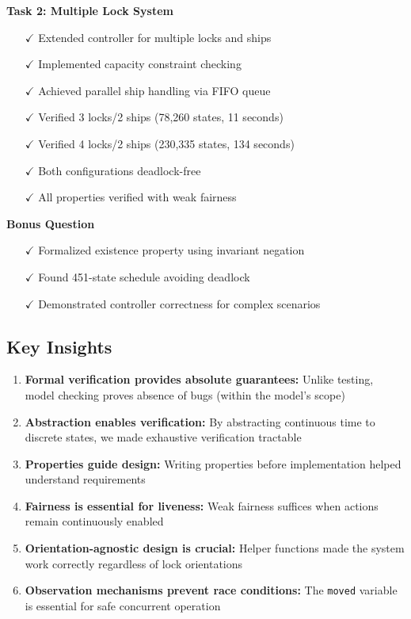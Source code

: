 \documentclass[12pt,a4paper]{article}
\begin{document}
\textbf{Task 2: Multiple Lock System}
\begin{itemize}
    \item[$\checkmark$] Extended controller for multiple locks and ships
    \item[$\checkmark$] Implemented capacity constraint checking
    \item[$\checkmark$] Achieved parallel ship handling via FIFO queue
    \item[$\checkmark$] Verified 3 locks/2 ships (78,260 states, 11 seconds)
    \item[$\checkmark$] Verified 4 locks/2 ships (230,335 states, 134 seconds)
    \item[$\checkmark$] Both configurations deadlock-free
    \item[$\checkmark$] All properties verified with weak fairness
\end{itemize}

\textbf{Bonus Question}
\begin{itemize}
    \item[$\checkmark$] Formalized existence property using invariant negation
    \item[$\checkmark$] Found 451-state schedule avoiding deadlock
    \item[$\checkmark$] Demonstrated controller correctness for complex scenarios
\end{itemize}

\subsection{Key Insights}

\begin{enumerate}
    \item \textbf{Formal verification provides absolute guarantees:} Unlike testing, model checking proves absence of bugs (within the model's scope)
    
    \item \textbf{Abstraction enables verification:} By abstracting continuous time to discrete states, we made exhaustive verification tractable
    
    \item \textbf{Properties guide design:} Writing properties before implementation helped understand requirements
    
    \item \textbf{Fairness is essential for liveness:} Weak fairness suffices when actions remain continuously enabled
    
    \item \textbf{Orientation-agnostic design is crucial:} Helper functions made the system work correctly regardless of lock orientations
    
    \item \textbf{Observation mechanisms prevent race conditions:} The \texttt{moved} variable is essential for safe concurrent operation
\end{enumerate}
\end{document}
